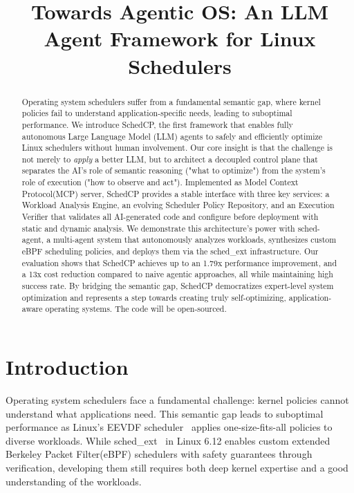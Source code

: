 \documentclass[preprint]{article}
\title{Towards Agentic OS: An LLM Agent Framework for Linux Schedulers}
\newcommand{\sys}{SchedCP\xspace}
\newcommand{\agent}{sched-agent\xspace}
\begin{document}
\maketitle


\begin{abstract}
Operating system schedulers suffer from a fundamental semantic gap, where kernel policies fail to understand application-specific needs, leading to suboptimal performance. We introduce \sys, the first framework that enables fully autonomous Large Language Model (LLM) agents to safely and efficiently optimize Linux schedulers without human involvement. Our core insight is that the challenge is not merely to \emph{apply} a better LLM, but to architect a decoupled control plane that separates the AI's role of semantic reasoning ("what to optimize") from the system's role of execution ("how to observe and act"). Implemented as Model Context Protocol(MCP) server, \sys provides a stable interface with three key services: a Workload Analysis Engine, an evolving Scheduler Policy Repository, and an Execution Verifier that validates all AI-generated code and configure before deployment with static and dynamic analysis. We demonstrate this architecture's power with \agent, a multi-agent system that autonomously analyzes workloads, synthesizes custom eBPF scheduling policies, and deploys them via the sched\_ext infrastructure. Our evaluation shows that SchedCP achieves up to an 1.79x performance improvement, and a 13x cost reduction compared to naive agentic approaches, all while maintaining high success rate. By bridging the semantic gap, SchedCP democratizes expert-level system optimization and represents a step towards creating truly self-optimizing, application-aware operating systems. The code will be open-sourced.
\end{abstract}



\maketitle
\section{Introduction}
\label{sec:intro}

Operating system schedulers face a fundamental challenge: kernel policies cannot understand what applications need. This semantic gap leads to suboptimal performance as Linux's EEVDF scheduler~\cite{eevdf2024} applies one-size-fits-all policies to diverse workloads. While sched\_ext~\cite{schedext2024} in Linux 6.12 enables custom extended Berkeley Packet Filter(eBPF) schedulers with safety guarantees through verification, developing them still requires both deep kernel expertise and a good understanding of the workloads.
\end{document}
